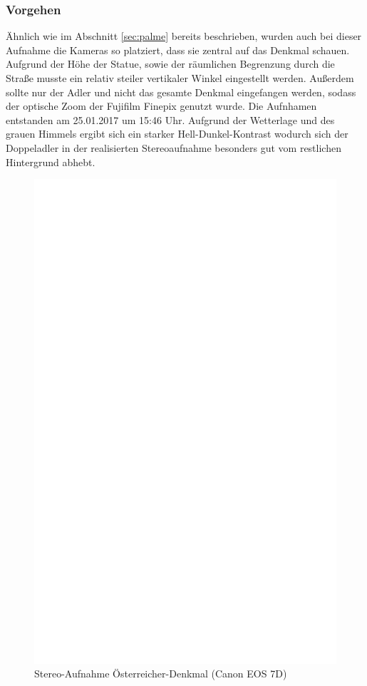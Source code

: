 \documentclass[liststotoc,bibtotoc,fontsize=14pt,]{scrreprt}
\begin{document}
\subsubsection{Vorgehen}
Ähnlich wie im Abschnitt \ref{sec:palme} bereits beschrieben, wurden auch bei dieser Aufnahme die Kameras so platziert, dass sie zentral auf das Denkmal schauen. Aufgrund der Höhe der Statue, sowie der räumlichen Begrenzung durch die Straße musste ein relativ steiler vertikaler Winkel eingestellt werden. Außerdem sollte nur der Adler und nicht das gesamte Denkmal eingefangen werden, sodass der optische Zoom der Fujifilm Finepix genutzt wurde. Die Aufnhamen entstanden am 25.01.2017 um 15:46 Uhr. Aufgrund der Wetterlage und des grauen Himmels ergibt sich ein starker Hell-Dunkel-Kontrast wodurch sich der Doppeladler in der realisierten Stereoaufnahme besonders gut vom restlichen Hintergrund abhebt. 

\newpage
\begin{figure}[h]
	\includegraphics[width=\linewidth]{img/ph.jpg}
	\caption{Stereo-Aufnahme Österreicher-Denkmal (Canon EOS 7D)}
\end{figure}
\end{document}

